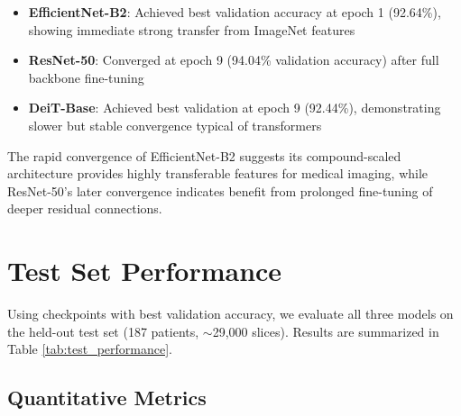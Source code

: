 \begin{itemize}
    \item \textbf{EfficientNet-B2}: Achieved best validation accuracy at epoch 1 (92.64\%), showing immediate strong transfer from ImageNet features
    \item \textbf{ResNet-50}: Converged at epoch 9 (94.04\% validation accuracy) after full backbone fine-tuning
    \item \textbf{DeiT-Base}: Achieved best validation at epoch 9 (92.44\%), demonstrating slower but stable convergence typical of transformers
\end{itemize}

The rapid convergence of EfficientNet-B2 suggests its compound-scaled architecture provides highly transferable features for medical imaging, while ResNet-50's later convergence indicates benefit from prolonged fine-tuning of deeper residual connections.

\section{Test Set Performance}

Using checkpoints with best validation accuracy, we evaluate all three models on the held-out test set (187 patients, $\sim$29,000 slices). Results are summarized in Table \ref{tab:test_performance}.

\subsection{Quantitative Metrics}


